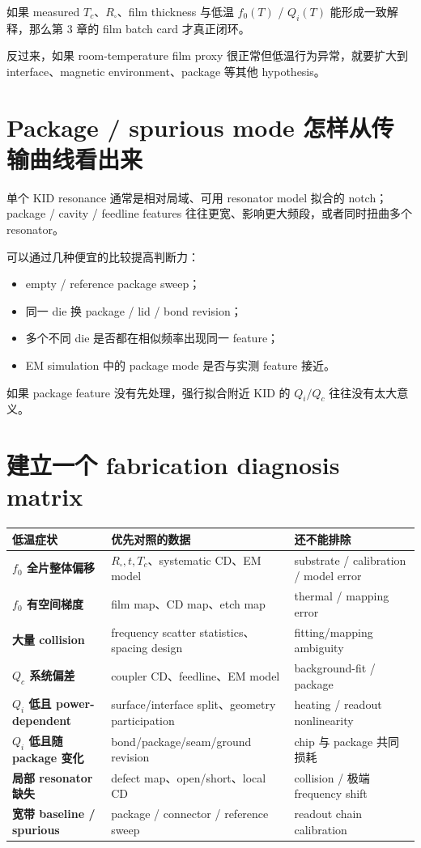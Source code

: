 如果 measured $T_c$、$R_\square$、film thickness 与低温 $f_0(T)$ / $Q_i(T)$ 能形成一致解释，那么第 3 章的 film batch card 才真正闭环。

反过来，如果 room-temperature film proxy 很正常但低温行为异常，就要扩大到 interface、magnetic environment、package 等其他 hypothesis。

\section{Package / spurious mode 怎样从传输曲线看出来}

单个 KID resonance 通常是相对局域、可用 resonator model 拟合的 notch；package / cavity / feedline features 往往更宽、影响更大频段，或者同时扭曲多个 resonator。

可以通过几种便宜的比较提高判断力：

\begin{itemize}
  \item empty / reference package sweep；
  \item 同一 die 换 package / lid / bond revision；
  \item 多个不同 die 是否都在相似频率出现同一 feature；
  \item EM simulation 中的 package mode 是否与实测 feature 接近。
\end{itemize}

如果 package feature 没有先处理，强行拟合附近 KID 的 $Q_i/Q_c$ 往往没有太大意义。

\section{建立一个 fabrication diagnosis matrix}

\begin{center}
\begin{tabularx}{0.98\textwidth}{>{\bfseries}p{3.3cm} X X}
\toprule
低温症状 & 优先对照的数据 & 还不能排除 \\
\midrule
$f_0$ 全片整体偏移 & $R_\square,t,T_c$、systematic CD、EM model & substrate / calibration / model error \\
$f_0$ 有空间梯度 & film map、CD map、etch map & thermal / mapping error \\
大量 collision & frequency scatter statistics、spacing design & fitting/mapping ambiguity \\
$Q_c$ 系统偏差 & coupler CD、feedline、EM model & background-fit / package \\
$Q_i$ 低且 power-dependent & surface/interface split、geometry participation & heating / readout nonlinearity \\
$Q_i$ 低且随 package 变化 & bond/package/seam/ground revision & chip 与 package 共同损耗 \\
局部 resonator 缺失 & defect map、open/short、local CD & collision / 极端 frequency shift \\
宽带 baseline / spurious & package / connector / reference sweep & readout chain calibration \\
\bottomrule
\end{tabularx}
\end{center}


